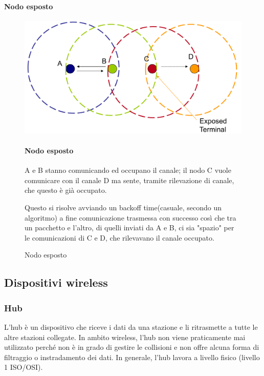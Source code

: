 \newpage

\paragraph{Nodo esposto}

\begin{figure}[h!]
    \centering
    \begin{minipage}{0.49\textwidth}
        \includegraphics[width=\linewidth]{images/nodoesposto.png}
    \end{minipage}
    \hfill
    \begin{minipage}{0.5\textwidth}
        \paragraph{Nodo esposto}
        A e B stanno comunicando ed occupano il canale; il nodo C vuole comunicare con il canale D ma sente, tramite rilevazione di canale, che questo è già occupato.

        Questo si risolve avviando un backoff time(casuale, secondo un algoritmo) a fine comunicazione trasmessa con successo così che tra un pacchetto e l'altro, di quelli inviati da A e B, ci sia "spazio" per le comunicazioni di C e D, che rilevavano il canale occupato.
    \end{minipage}
    \caption{Nodo esposto}
    \label{fig:nodo esposto}
\end{figure}


\subsection{Dispositivi wireless}

\subsubsection{Hub}
L'hub è un dispositivo che riceve i dati da una stazione e li ritrasmette a tutte le altre stazioni collegate. In ambito wireless, l'hub non viene praticamente mai utilizzato perché non è in grado di gestire le collisioni e non offre alcuna forma di filtraggio o instradamento dei dati. In generale, l'hub lavora a livello fisico (livello 1 ISO/OSI).

